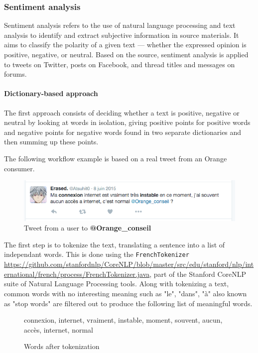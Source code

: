 \documentclass[11pt]{article}
\begin{document}
\subsubsection{Sentiment analysis}

Sentiment analysis refers to the use of natural language processing and text analysis to identify and extract subjective information in source materials. It aims to classify the polarity of a given text — whether the expressed opinion is positive, negative, or neutral. 
Based on the source, sentiment analysis is applied to tweets on Twitter, posts on Facebook, and thread titles and messages on forums.

\paragraph{Dictionary-based approach}

The first approach consists of deciding whether a text is positive, negative or neutral by looking at words in isolation, giving positive points for positive words and negative points for negative words found in two separate dictionaries and then summing up these points.

The following workflow example is based on a real tweet from an Orange consumer.

\begin{figure}[h!]
    \centering
    \includegraphics[scale=0.6]{img/tweet1.png}
    \caption{Tweet from a user to \textbf{@Orange\_conseil}}
    \label{tweet1}
\end{figure}

The first step is to tokenize the text, translating a sentence into a list of independant words. This is done using the \texttt{FrenchTokenizer} \url{https://github.com/stanfordnlp/CoreNLP/blob/master/src/edu/stanford/nlp/international/french/process/FrenchTokenizer.java}, part of the Stanford CoreNLP suite of Natural Language Processing tools. Along with tokenizing a text, common words with no interesting meaning such as "le", "dans", "à" also known as "stop words" are filtered out to produce the following list of meaningful words.

\begin{figure}[h!]
    \centering
    connexion, internet, vraiment, instable, moment, souvent, aucun, accès, internet, normal
    \caption{Words after tokenization}
    \label{tokens}
\end{figure}
\end{document}
